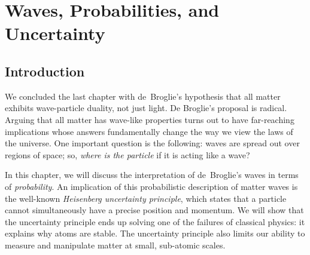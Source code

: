 \chapter[Waves, Probabilities, and Uncertainty]{Waves, Probabilities, and 
  Uncertainty}

\label{chapter:uncertainty}

\section{Introduction}
\label{sec:uncertainty_intro}

We concluded the last chapter with de~Broglie's hypothesis that all
matter exhibits wave-particle duality, not just light.  
De Broglie's proposal is radical.  Arguing that all matter has wave-like
properties turns out to have far-reaching implications whose answers
fundamentally change the way we view the laws of the universe.
One important question is the following: waves are spread out over regions
of space; so, {\it where is the particle} if it is acting like a wave?

In this chapter, we will discuss the interpretation of de~Broglie's waves
in terms of {\it probability}. An implication of this probabilistic
description of matter waves is the well-known \textit{Heisenberg
uncertainty principle}, which states that a particle cannot simultaneously
have a precise position and momentum.  We will show that the uncertainty
principle ends up solving one of the failures of classical physics:
it explains why atoms are stable. The uncertainty principle also limits
our ability to measure and manipulate matter at small, sub-atomic scales.

